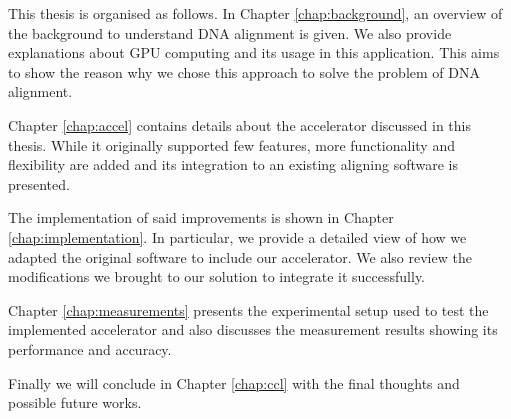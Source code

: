 This thesis is organised as follows.
In Chapter \ref{chap:background}, an overview of the background to understand DNA alignment is given. We also provide explanations about GPU computing and its usage in this application. This aims to show the reason why we chose this approach to solve the problem of DNA alignment.

Chapter \ref{chap:accel} contains details about the accelerator discussed in this thesis. While it originally supported few features, more functionality and flexibility are added and its integration to an existing aligning software is presented.

The implementation of said improvements is shown in Chapter \ref{chap:implementation}. In particular, we provide a detailed view of how we adapted the original software to include our accelerator. We also review the modifications we brought to our solution to integrate it successfully.

Chapter \ref{chap:measurements} presents the experimental setup used to test the implemented accelerator and also discusses the measurement results showing its performance and accuracy.

Finally we will conclude in Chapter \ref{chap:ccl} with the final thoughts and possible future works.